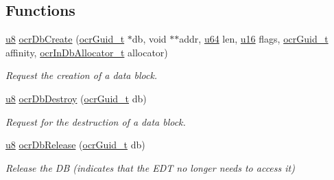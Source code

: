 \subsection*{Functions}
\begin{DoxyCompactItemize}
\item 
\hyperlink{group__OCRTypesGeneral_ga92c50087ca0e64fa93fc59402c55f8ca}{u8} \hyperlink{group__OCRDataBlock_ga8781682157ebe73114af805cc3539a22}
{ocr\-Db\-Create} (\hyperlink{group__OCRTypesGeneral_gacde3883d1ce245c051133c2c3aa82fc8}{ocr\-Guid\-\_\-t} $\ast$db, void $\ast$$\ast$addr, \hyperlink{group__OCRTypesGeneral_ga3f7e2bcbb0b4c338f3c4f6c937cd4234}{u64} len, \hyperlink{group__OCRTypesGeneral_gace9d960e74685e2cd84b36132dbbf8aa}{u16} flags, \hyperlink{group__OCRTypesGeneral_gacde3883d1ce245c051133c2c3aa82fc8}{ocr\-Guid\-\_\-t} affinity, \hyperlink{group__OCRTypesDB_gabffd082fa19860aa5a9822beba6b68a5}{ocr\-In\-Db\-Allocator\-\_\-t} allocator)
\begin{DoxyCompactList}\small\item\em Request the creation of a data block. \end{DoxyCompactList}

\item 
\hyperlink{group__OCRTypesGeneral_ga92c50087ca0e64fa93fc59402c55f8ca}{u8} \hyperlink{group__OCRDataBlock_gabc80ea5594e5e55a541a1df4c7727821}
{ocr\-Db\-Destroy} (\hyperlink{group__OCRTypesGeneral_gacde3883d1ce245c051133c2c3aa82fc8}{ocr\-Guid\-\_\-t} db)
\begin{DoxyCompactList}\small\item\em Request for the destruction of a data block. \end{DoxyCompactList}

\item 
\hyperlink{group__OCRTypesGeneral_ga92c50087ca0e64fa93fc59402c55f8ca}{u8} \hyperlink{group__OCRDataBlock_ga2ec03c0b0998bdaf9ccc44a06fb05ca0}
{ocr\-Db\-Release} (\hyperlink{group__OCRTypesGeneral_gacde3883d1ce245c051133c2c3aa82fc8}{ocr\-Guid\-\_\-t} db)
\begin{DoxyCompactList}\small\item\em Release the D\-B (indicates that the E\-D\-T no longer needs to access it) \end{DoxyCompactList}

\end{DoxyCompactItemize}


